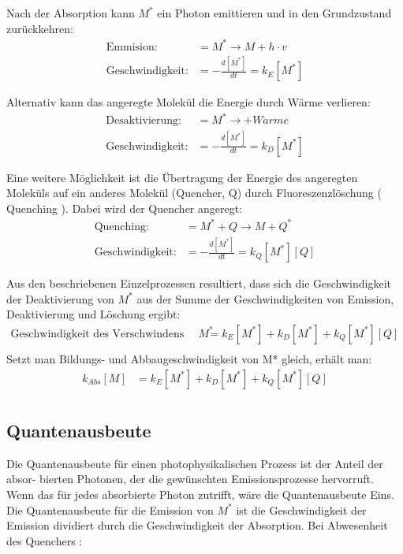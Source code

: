 \documentclass[12pt]{article}
\begin{document}
Nach der Absorption kann $M^*$ ein Photon emittieren und in den Grundzustand zurückkehren:
\begin{align*}
 \text{Emmision:} &= M^* \rightarrow M +  h \cdot v\\
 \text{Geschwindigkeit:} &= -\frac{d[M^*]}{dt} = k _{E} [M^*]
\end{align*}

Alternativ kann das angeregte Molekül die Energie durch Wärme verlieren:
\begin{align*}
 \text{Desaktivierung:} &= M^* \rightarrow +  W\ddot{a}rme\\
 \text{Geschwindigkeit:} &= - \frac{d[M^*]}{dt} = k _{D} [M^*]
\end{align*}

Eine weitere Möglichkeit ist die Übertragung der Energie des angeregten Moleküls auf ein
anderes Molekül (Quencher, Q) durch Fluoreszenzlöschung ( Quenching ). Dabei wird
der Quencher angeregt:
\begin{align*}
 \text{Quenching:} &= M^* + Q \rightarrow M +  Q^*\\
 \text{Geschwindigkeit:} &= - \frac{d[M^*]}{dt} = k _{Q} [M^*] [Q]
\end{align*}

Aus den beschriebenen Einzelprozessen resultiert, dass sich die Geschwindigkeit der Deaktivierung von $M^*$ aus der Summe der Geschwindigkeiten von Emission, Deaktivierung
und Löschung ergibt:
\begin{align*}
 \text{Geschwindigkeit des Verschwindens von } M^* &=  k _{E} [M^*] + k _{D} [M^*] + k _{Q} [M^*] [Q]\\
\end{align*}
Setzt man Bildungs- und Abbaugeschwindigkeit von M* gleich, erhält man:
\begin{align*}
 k_{Abs} [M] &=  k _{E} [M^*] + k _{D} [M^*] + k _{Q} [M^*] [Q]\\
\end{align*}
\subsection{Quantenausbeute\supercite{harris}} %
\label{ssub:quantenausbeute}

\grqq Die Quantenausbeute für einen photophysikalischen Prozess ist der Anteil der absor-
bierten Photonen, der die gewünschten Emissionsprozesse hervorruft. Wenn das für jedes
absorbierte Photon zutrifft, wäre die Quantenausbeute Eins.\grqq
Die Quantenausbeute für die Emission von $M^*$ ist die Geschwindigkeit der Emission
dividiert durch die Geschwindigkeit der Absorption. Bei Abwesenheit des Quenchers :
\end{document}
